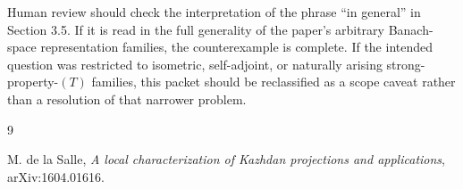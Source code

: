 \documentclass[11pt]{article}
\begin{document}
Human review should check the interpretation of the phrase ``in general'' in
Section 3.5. If it is read in the full generality of the paper's arbitrary
Banach-space representation families, the counterexample is complete. If the
intended question was restricted to isometric, self-adjoint, or naturally
arising strong-property-\((T)\) families, this packet should be reclassified as
a scope caveat rather than a resolution of that narrower problem.

\begin{thebibliography}{9}

M. de la Salle,
\emph{A local characterization of Kazhdan projections and applications},
arXiv:1604.01616.

\end{thebibliography}
\end{document}
